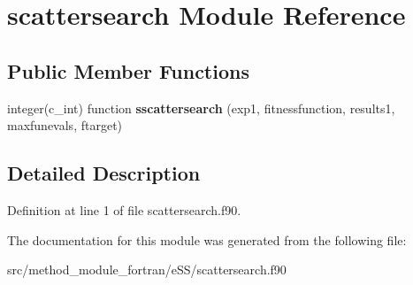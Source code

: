 \hypertarget{classscattersearch}{\section{scattersearch Module Reference}
\label{classscattersearch}
}
\subsection*{Public Member Functions}
\begin{DoxyCompactItemize}
\item 
\hypertarget{classscattersearch_a6065ed097f543fc1264dea6ecd64b68d}{integer(c\-\_\-int) function {\bfseries sscattersearch} (exp1, fitnessfunction, results1, maxfunevals, ftarget)}\label{classscattersearch_a6065ed097f543fc1264dea6ecd64b68d}

\end{DoxyCompactItemize}


\subsection{Detailed Description}


Definition at line 1 of file scattersearch.\-f90.



The documentation for this module was generated from the following file\-:\begin{DoxyCompactItemize}
\item 
src/method\-\_\-module\-\_\-fortran/e\-S\-S/scattersearch.\-f90\end{DoxyCompactItemize}
